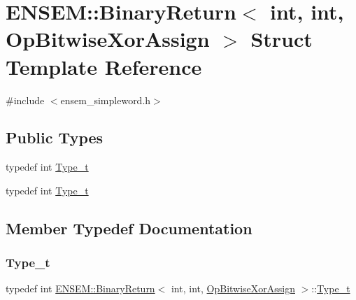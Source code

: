 \hypertarget{structENSEM_1_1BinaryReturn_3_01int_00_01int_00_01OpBitwiseXorAssign_01_4}{}\section{E\+N\+S\+EM\+:\+:Binary\+Return$<$ int, int, Op\+Bitwise\+Xor\+Assign $>$ Struct Template Reference}
\label{structENSEM_1_1BinaryReturn_3_01int_00_01int_00_01OpBitwiseXorAssign_01_4}


{\ttfamily \#include $<$ensem\+\_\+simpleword.\+h$>$}

\subsection*{Public Types}
\begin{DoxyCompactItemize}
\item 
typedef int \mbox{\hyperlink{structENSEM_1_1BinaryReturn_3_01int_00_01int_00_01OpBitwiseXorAssign_01_4_a8ee67fcadda1141739b4054917e9e3d2}{Type\+\_\+t}}
\item 
typedef int \mbox{\hyperlink{structENSEM_1_1BinaryReturn_3_01int_00_01int_00_01OpBitwiseXorAssign_01_4_a8ee67fcadda1141739b4054917e9e3d2}{Type\+\_\+t}}
\end{DoxyCompactItemize}


\subsection{Member Typedef Documentation}
\mbox{\label{structENSEM_1_1BinaryReturn_3_01int_00_01int_00_01OpBitwiseXorAssign_01_4_a8ee67fcadda1141739b4054917e9e3d2}} 
\subsubsection{\texorpdfstring{Type\_t}{Type\_t}\hspace{0.1cm}{\footnotesize\ttfamily [1/2]}}
{\footnotesize\ttfamily typedef int \mbox{\hyperlink{structENSEM_1_1BinaryReturn}{E\+N\+S\+E\+M\+::\+Binary\+Return}}$<$ int, int, \mbox{\hyperlink{structENSEM_1_1OpBitwiseXorAssign}{Op\+Bitwise\+Xor\+Assign}} $>$\+::\mbox{\hyperlink{structENSEM_1_1BinaryReturn_3_01int_00_01int_00_01OpBitwiseXorAssign_01_4_a8ee67fcadda1141739b4054917e9e3d2}{Type\+\_\+t}}}

